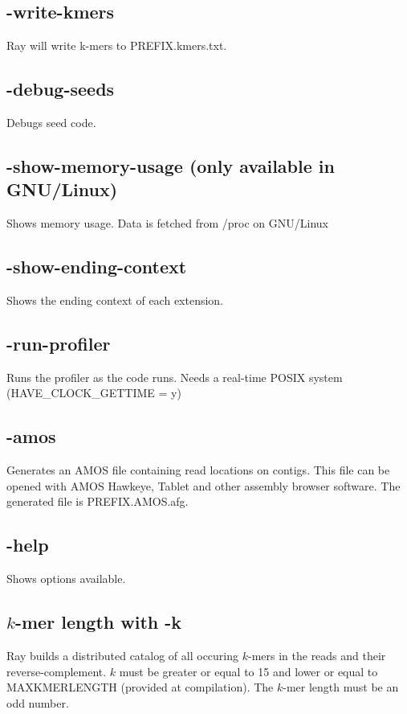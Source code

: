 \documentclass{article}
\begin{document}
\subsection{
-write-kmers
}
Ray will write k-mers to PREFIX.kmers.txt.

\subsection{      
       -debug-seeds
}
              Debugs seed code.

\subsection{      
       -show-memory-usage (only available in GNU/Linux)
}
              Shows memory usage. Data is fetched from /proc on GNU/Linux

\subsection{      
       -show-ending-context
}
              Shows the ending context of each extension.

\subsection{      
       -run-profiler
}
              Runs the profiler as the code runs. Needs a real-time POSIX system (HAVE\_CLOCK\_GETTIME = y)

\subsection{-amos}

Generates an AMOS file containing read locations on contigs. This file can be opened with AMOS Hawkeye, Tablet and other assembly browser
software. The generated file is PREFIX.AMOS.afg.



\subsection{
-help
}
Shows options available.

\subsection{$k$-mer length with -k}

Ray builds a distributed catalog of all occuring $k$-mers in the reads and their reverse-complement. $k$ must be greater or equal to 15 and lower or equal to MAXKMERLENGTH (provided at compilation). The $k$-mer length must be an odd number.
\end{document}
